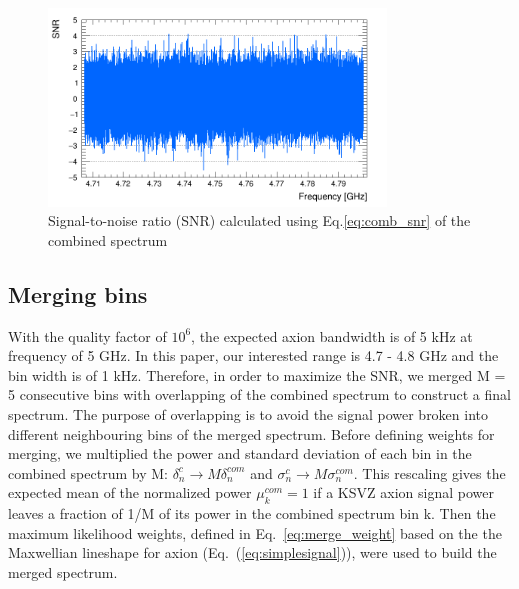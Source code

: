 \begin{figure}[hbt!]
    \centering
    \includegraphics[width=0.8\textwidth,height=0.4\textwidth]{figures/SNR_CombSpectrum_AxionRun_AllSteps_Rescan_SG4_W201_LqWeight.png}
    \caption{Signal-to-noise ratio (SNR) calculated using Eq.\eqref{eq:comb_snr} of the combined spectrum }
    \label{fig:SNR_comb}
\end{figure}



\subsection{Merging bins}

With the quality factor of $10^6$, the expected axion bandwidth is of 5 kHz at frequency of 5 GHz. In this paper, our interested range is 4.7 - 4.8 GHz and the bin width is of 1 kHz. Therefore, in order to maximize the SNR, we merged M = 5 consecutive bins with overlapping of the combined spectrum to construct a final spectrum.
The purpose of overlapping is to avoid the signal power broken into different neighbouring bins of the merged spectrum. Before defining weights for merging, we multiplied the power and standard deviation of each bin in the combined spectrum by M: $\delta^{c}_n \rightarrow M\delta^{com}_n$ and $\sigma^{c}_n \rightarrow M \sigma^{com}_n$. This rescaling gives the expected mean of the normalized power $\mu^{com}_k = 1$ if a KSVZ axion signal power leaves a fraction of 1/M of its power in the combined spectrum bin k.
Then the maximum likelihood weights, defined in Eq.~\ref{eq:merge_weight} based on the the Maxwellian lineshape for axion (Eq.~(\ref{eq:simplesignal})), were used to build the merged spectrum.

